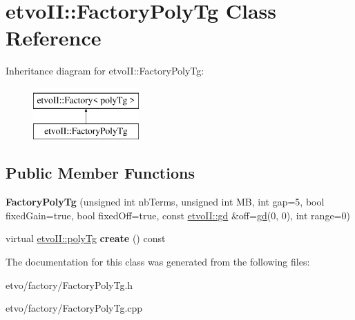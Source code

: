 \hypertarget{classetvo_i_i_1_1_factory_poly_tg}{}\section{etvo\+II\+:\+:Factory\+Poly\+Tg Class Reference}
\label{classetvo_i_i_1_1_factory_poly_tg}
Inheritance diagram for etvo\+II\+:\+:Factory\+Poly\+Tg\+:\begin{figure}[H]
\begin{center}
\leavevmode
\includegraphics[height=2.000000cm]{classetvo_i_i_1_1_factory_poly_tg}
\end{center}
\end{figure}
\subsection*{Public Member Functions}
\begin{DoxyCompactItemize}
\item 
\mbox{\label{classetvo_i_i_1_1_factory_poly_tg_a8d4e35219144179322320573b7de2a41}} 
{\bfseries Factory\+Poly\+Tg} (unsigned int nb\+Terms, unsigned int MB, int gap=5, bool fixed\+Gain=true, bool fixed\+Off=true, const \mbox{\hyperlink{classetvo_i_i_1_1gd}{etvo\+I\+I\+::gd}} \&off=\mbox{\hyperlink{classetvo_i_i_1_1gd}{gd}}(0, 0), int range=0)
\item 
\mbox{\label{classetvo_i_i_1_1_factory_poly_tg_a2186561e95cb41fa39280b7f93ed28ed}} 
virtual \mbox{\hyperlink{classetvo_i_i_1_1poly_tg}{etvo\+I\+I\+::poly\+Tg}} {\bfseries create} () const
\end{DoxyCompactItemize}


The documentation for this class was generated from the following files\+:\begin{DoxyCompactItemize}
\item 
etvo/factory/Factory\+Poly\+Tg.\+h\item 
etvo/factory/Factory\+Poly\+Tg.\+cpp\end{DoxyCompactItemize}

